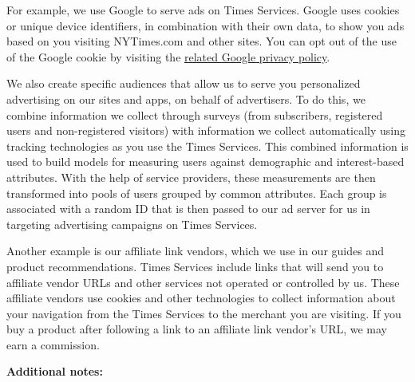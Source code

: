For example, we use Google to serve ads on Times Services. Google uses
cookies or unique device identifiers, in combination with their own
data, to show you ads based on you visiting NYTimes.com and other sites.
You can opt out of the use of the Google cookie by visiting the
\href{https://policies.google.com/technologies/ads?hl=en}{related Google
privacy policy}.

We also create specific audiences that allow us to serve you
personalized advertising on our sites and apps, on behalf of
advertisers. To do this, we combine information we collect through
surveys (from subscribers, registered users and non-registered visitors)
with information we collect automatically using tracking technologies as
you use the Times Services. This combined information is used to build
models for measuring users against demographic and interest-based
attributes. With the help of service providers, these measurements are
then transformed into pools of users grouped by common attributes. Each
group is associated with a random ID that is then passed to our ad
server for us in targeting advertising campaigns on Times Services.

Another example is our affiliate link vendors, which we use in our
guides and product recommendations. Times Services include links that
will send you to affiliate vendor URLs and other services not operated
or controlled by us. These affiliate vendors use cookies and other
technologies to collect information about your navigation from the Times
Services to the merchant you are visiting. If you buy a product after
following a link to an affiliate link vendor's URL, we may earn a
commission.

\textbf{Additional notes:}

